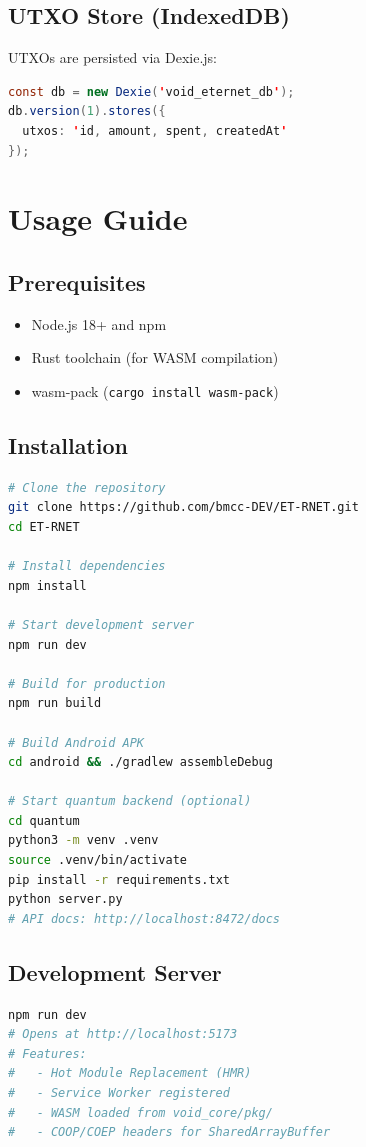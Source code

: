 \documentclass[11pt,a4paper]{article}
\begin{document}
\subsection{UTXO Store (IndexedDB)}
UTXOs are persisted via Dexie.js:
\begin{lstlisting}[language=Java, caption=UTXO Schema]
const db = new Dexie('void_eternet_db');
db.version(1).stores({
  utxos: 'id, amount, spent, createdAt'
});
\end{lstlisting}

\section{Usage Guide}

\subsection{Prerequisites}
\begin{itemize}[nosep]
  \item Node.js 18+ and npm
  \item Rust toolchain (for WASM compilation)
  \item wasm-pack (\texttt{cargo install wasm-pack})
\end{itemize}

\subsection{Installation}
\begin{lstlisting}[language=bash, caption=Quick Start]
# Clone the repository
git clone https://github.com/bmcc-DEV/ET-RNET.git
cd ET-RNET

# Install dependencies
npm install

# Start development server
npm run dev

# Build for production
npm run build

# Build Android APK
cd android && ./gradlew assembleDebug

# Start quantum backend (optional)
cd quantum
python3 -m venv .venv
source .venv/bin/activate
pip install -r requirements.txt
python server.py
# API docs: http://localhost:8472/docs
\end{lstlisting}

\subsection{Development Server}
\begin{lstlisting}[language=bash]
npm run dev
# Opens at http://localhost:5173
# Features:
#   - Hot Module Replacement (HMR)
#   - Service Worker registered
#   - WASM loaded from void_core/pkg/
#   - COOP/COEP headers for SharedArrayBuffer
\end{lstlisting}
\end{document}
